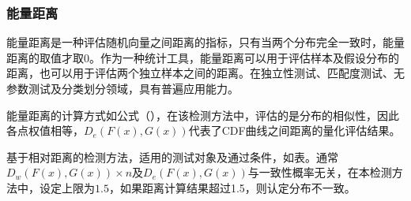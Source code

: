 \subsubsection{能量距离}
\label{chap:analyze:statistical:distance:energy}

能量距离是一种评估随机向量之间距离的指标，只有当两个分布完全一致时，能量距离的取值才取0。作为一种统计工具，能量距离可以用于评估样本及假设分布的距离，也可以用于评估两个独立样本之间的距离。在独立性测试、匹配度测试、无参数测试及分类划分领域，具有普遍应用能力。


能量距离的计算方式如公式（），在该检测方法中，评估的是分布的相似性，因此各点权值相等，$D_{e}(F(x),G(x))$代表了CDF曲线之间距离的量化评估结果。


基于相对距离的检测方法，适用的测试对象及通过条件，如表。通常$D_{w}(F(x),G(x))\times n$及$D_{e}(F(x),G(x))$与一致性概率无关，在本检测方法中，设定上限为$1.5$，如果距离计算结果超过1.5，则认定分布不一致。

